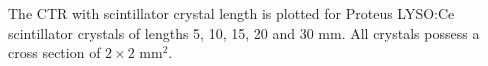 \label{fig:standardctr} The CTR with scintillator crystal length is plotted for Proteus LYSO:Ce scintillator crystals of lengths 5, 10, 15, 20 and 30 mm. All crystals possess a cross section of $2\times2$ mm$^2$.